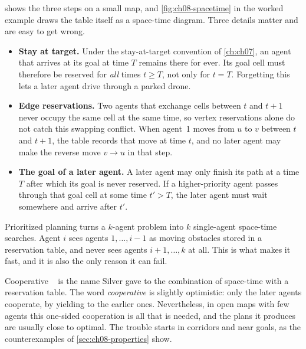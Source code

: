  shows the three steps on a small map, and
\cref{fig:ch08-spacetime} in the worked example draws the table itself as a space-time
diagram. Three details matter and are easy to get wrong.
\begin{itemize}
  \item \textbf{Stay at target.} Under the stay-at-target
        convention of \cref{ch:ch07}, an agent that arrives at its goal at time $T$
        remains there for ever. Its goal cell must therefore be reserved for \emph{all}
        times $t \ge T$, not only for $t = T$. Forgetting this lets a later agent drive
        through a parked drone.
  \item \textbf{Edge reservations.} Two agents that exchange cells between $t$ and $t+1$
        never occupy the same cell at the same time, so vertex reservations alone do not
        catch this swapping conflict. When agent~1 moves from $u$ to $v$ between $t$ and
        $t+1$, the table records that move at time $t$, and no later agent may make
        the reverse move $v \to u$ in that step.
  \item \textbf{The goal of a later agent.} A later agent may only finish its path at a
        time $T$ after which its goal is never reserved. If a higher-priority agent
        passes through that goal cell at some time $t' > T$, the later agent must wait
        somewhere and arrive after $t'$.
\end{itemize}

\begin{keyidea}
Prioritized planning turns a $k$-agent problem into $k$ single-agent space-time searches.
Agent $i$ sees agents $1, \dots, i-1$ as moving obstacles stored in a reservation table,
and never sees agents $i+1, \dots, k$ at all. This is what makes it fast, and it is also
the only reason it can fail.
\end{keyidea}

Cooperative \astar{}~\cite{silver2005cooperative} is the name Silver
gave to the combination of space-time \astar with a reservation table. The word
\emph{cooperative} is slightly optimistic: only the later agents cooperate, by yielding
to the earlier ones. Nevertheless, in open maps with few agents this one-sided
cooperation is all that is needed, and the plans it produces are usually close to
optimal. The trouble starts in corridors and near goals, as the counterexamples of
\cref{sec:ch08-properties} show.

